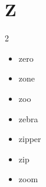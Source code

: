 \documentclass[../../book.tex]{subfiles}
\begin{document}
\section{Z}
\raggedcolumns
\begin{multicols}{2}
\begin{itemize}
\item[-] zero
\item[-] zone
\item[-] zoo
\item[-] zebra
\item[-] zipper
\item[-] zip
\item[-] zoom
\end{itemize}
\end{multicols}
\end{document}
